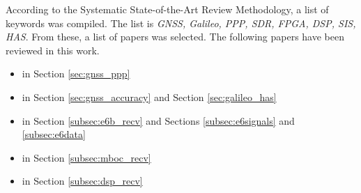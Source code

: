 According to the Systematic State-of-the-Art Review Methodology, a list of keywords was compiled. The list is \emph{GNSS, Galileo, PPP, SDR, FPGA, DSP, SIS, HAS}. From these, a list of papers was selected. The following papers have been reviewed in this work.

\begin{itemize}
    \item \cite{instantPPP} in Section \ref{sec:gnss_ppp}
    \item \cite{galileoHasPolicy} in Section \ref{sec:gnss_accuracy} and Section \ref{sec:galileo_has}
    \item \cite{e6breceiver} in Section \ref{subsec:e6b_recv} and Sections \ref{subsec:e6signals} and \ref{subsec:e6data}
    \item \cite{ref_station_receiver} in Section \ref{subsec:mboc_recv}
    \item \cite{dsp_receiver} in Section \ref{subsec:dsp_recv}
\end{itemize}